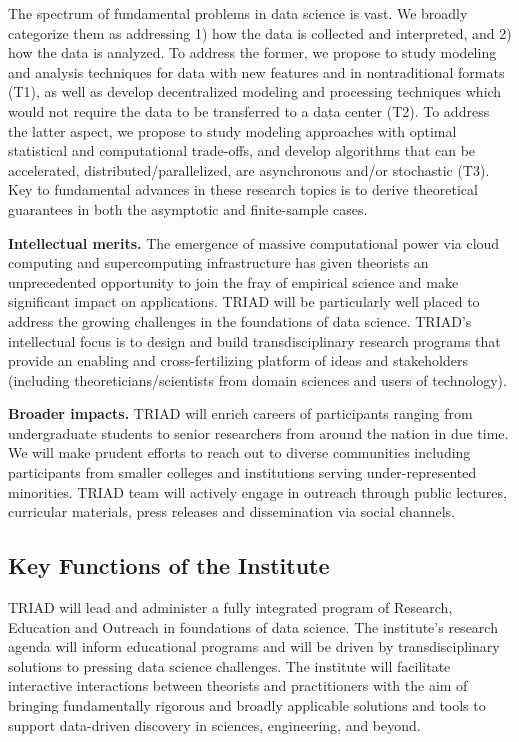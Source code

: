 \documentclass[12pt]{article}
\begin{document}
The spectrum of fundamental problems in data science is vast. We broadly categorize them as
addressing 1) how the data is collected and interpreted, and 2) how the data is analyzed.
To address the former, we propose to study modeling and analysis techniques for data with new features and in nontraditional formats (T1), as well as develop decentralized modeling and
processing techniques which would not require the data to be transferred to a data center (T2).
To address the latter aspect, we propose to study modeling approaches with optimal statistical
and computational trade-offs, and develop algorithms that can be accelerated, distributed/parallelized, are asynchronous and/or stochastic (T3).
Key to fundamental advances in these research topics is to derive theoretical guarantees in both the asymptotic and finite-sample cases.

{\bf Intellectual merits.}
The emergence of massive computational power via cloud computing and supercomputing infrastructure
has given theorists an unprecedented opportunity to join the fray of empirical science and make
significant impact on applications. TRIAD will be particularly well placed to address the growing challenges in the foundations of data science. TRIAD's intellectual focus is to design and build
transdisciplinary research programs that provide an enabling and cross-fertilizing platform of ideas and stakeholders (including theoreticians/scientists from domain sciences and users of technology).


{\bf Broader impacts.}
TRIAD will enrich careers of participants ranging from undergraduate students to senior researchers from around the nation in due time. We will make prudent efforts to reach out to diverse
communities including participants from smaller colleges and institutions serving under-represented minorities. TRIAD team will actively engage in outreach through public lectures, curricular
materials, press releases and dissemination via social channels.

\vspace*{-1em}
\subsection{Key Functions of the Institute}
TRIAD will lead and administer a fully integrated program of Research, Education and Outreach in foundations of data science.  The institute's research agenda will inform educational programs and
will be driven by transdisciplinary solutions to pressing data science challenges.  The institute will facilitate interactive interactions between theorists and practitioners with the aim of bringing fundamentally rigorous and broadly applicable solutions and tools to support data-driven discovery in sciences, engineering, and beyond.
\end{document}
